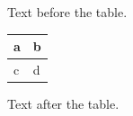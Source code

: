 \documentclass[12pt]{article}
\begin{document}
Text before the table.

\begin{tabular}{|l|l|}\hline a & b\\\hline c & d\\\hline\end{tabular}

Text after the table.
\end{document}

